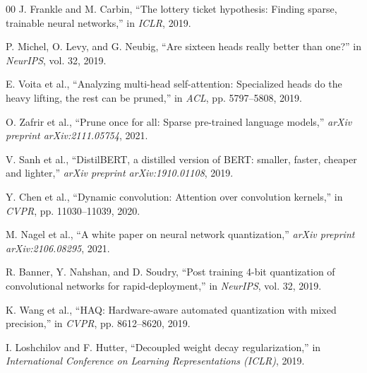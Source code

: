 \documentclass[11pt, conference]{IEEEtran}
\begin{document}
\begin{thebibliography}{00}
J. Frankle and M. Carbin, ``The lottery ticket hypothesis: Finding sparse, trainable neural networks,'' in \textit{ICLR}, 2019.

P. Michel, O. Levy, and G. Neubig, ``Are sixteen heads really better than one?'' in \textit{NeurIPS}, vol. 32, 2019.

E. Voita et al., ``Analyzing multi-head self-attention: Specialized heads do the heavy lifting, the rest can be pruned,'' in \textit{ACL}, pp. 5797--5808, 2019.

O. Zafrir et al., ``Prune once for all: Sparse pre-trained language models,'' \textit{arXiv preprint arXiv:2111.05754}, 2021.

V. Sanh et al., ``DistilBERT, a distilled version of BERT: smaller, faster, cheaper and lighter,'' \textit{arXiv preprint arXiv:1910.01108}, 2019.

Y. Chen et al., ``Dynamic convolution: Attention over convolution kernels,'' in \textit{CVPR}, pp. 11030--11039, 2020.

M. Nagel et al., ``A white paper on neural network quantization,'' \textit{arXiv preprint arXiv:2106.08295}, 2021.

R. Banner, Y. Nahshan, and D. Soudry, ``Post training 4-bit quantization of convolutional networks for rapid-deployment,'' in \textit{NeurIPS}, vol. 32, 2019.

K. Wang et al., ``HAQ: Hardware-aware automated quantization with mixed precision,'' in \textit{CVPR}, pp. 8612--8620, 2019.

I. Loshchilov and F. Hutter, ``Decoupled weight decay regularization,'' in \textit{International Conference on Learning Representations (ICLR)}, 2019.

\end{thebibliography}
\end{document}
